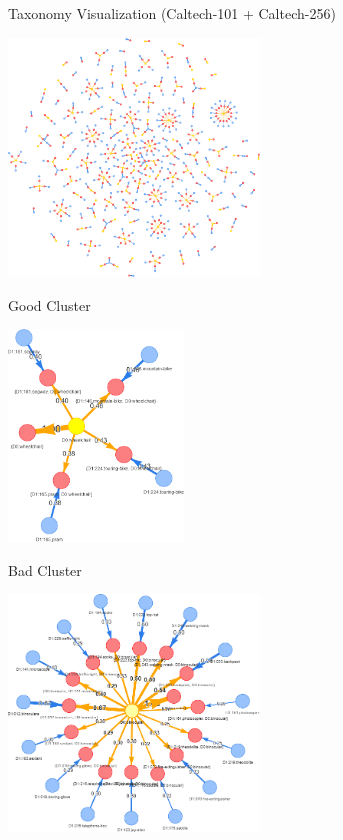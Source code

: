 \documentclass[aspectratio=169]{beamer}
\begin{document}
\begin{frame}{Taxonomy Visualization (Caltech-101 + Caltech-256)}
    \begin{center}
        \includegraphics[width=0.5\textwidth]{../thesis/figures/taxonomy.png}
    \end{center}
\end{frame}

\begin{frame}{Good Cluster}
    \begin{center}
        \includegraphics[width=0.35\textwidth]{../thesis/figures/wheel_concept.png}
    \end{center}
\end{frame}

\begin{frame}{Bad Cluster}
    \begin{center}
        \includegraphics[width=0.5\textwidth]{../thesis/figures/bad_taxonomy.png}
    \end{center}
\end{frame}
\end{document}

